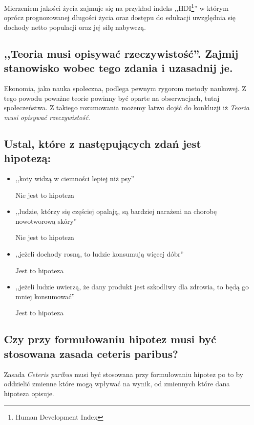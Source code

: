 \documentclass[a4paper,12pt]{article}
\begin{document}
Mierzeniem jakości życia zajmuje się na przykład indeks ,,HDI\footnote{Human Development Index}'' w którym oprócz prognozowanej długości życia oraz dostępu do edukacji uwzględnia się dochody netto populacji oraz jej siłę nabywczą.

\subsection{,,Teoria musi opisywać rzeczywistość''. Zajmij stanowisko wobec tego zdania i uzasadnij je.}

Ekonomia, jako nauka społeczna, podlega pewnym rygorom metody naukowej. Z tego powodu poważne teorie powinny być oparte na obserwacjach, tutaj społeczeństwa. Z takiego rozumowania możemy łatwo dojść do konkluzji iż \emph{Teoria musi opisywać rzeczywistość}.

\subsection{Ustal, które z następujących zdań jest hipotezą:}

\begin{itemize}
	\item ,,koty widzą w ciemności lepiej niż psy''

	      Nie jest to hipoteza

	\item ,,ludzie, którzy się częściej opalają, są bardziej narażeni na chorobę nowotworową skóry''

	      Nie jest to hipoteza

	\item ,,jeżeli dochody rosną, to ludzie konsumują więcej dóbr''

	      Jest to hipoteza

	\item ,,jeżeli ludzie uwierzą, że dany produkt jest szkodliwy dla zdrowia, to będą go mniej konsumować''

	      Jest to hipoteza
\end{itemize}

\subsection{Czy przy formułowaniu hipotez musi być stosowana zasada ceteris paribus?}

Zasada \emph{Ceteris paribus} musi być stosowana przy formułowaniu hipotez po to by oddzielić zmienne które mogą wpływać na wynik, od zmiennych które dana hipoteza opisuje.
\end{document}
